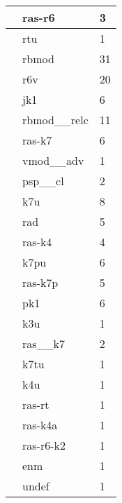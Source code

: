 \documentclass[a4 paper]{article}
\begin{document}
\begin{longtable}{cp{}p{}}
\midrule  & ras-r6 & 3\\ \midrule  & rtu & 1\\ \midrule  & rbmod & 31\\ \midrule  & r6v & 20\\ \midrule  & jk1 & 6\\ \midrule  & rbmod\_\_relc & 11\\ \midrule  & ras-k7 & 6\\ \midrule  & vmod\_\_adv & 1\\ \midrule  & psp\_\_cl & 2\\ \midrule  & k7u & 8\\ \midrule  & rad & 5\\ \midrule  & ras-k4 & 4\\ \midrule  & k7pu & 6\\ \midrule  & ras-k7p & 5\\ \midrule  & pk1 & 6\\ \midrule  & k3u & 1\\ \midrule  & ras\_\_k7 & 2\\ \midrule  & k7tu & 1\\ \midrule  & k4u & 1\\ \midrule  & ras-rt & 1\\ \midrule  & ras-k4a & 1\\ \midrule  & ras-r6-k2 & 1\\ \midrule  & enm & 1\\ \midrule  & undef & 1\\ \midrule 

\end{longtable}
\end{document}
